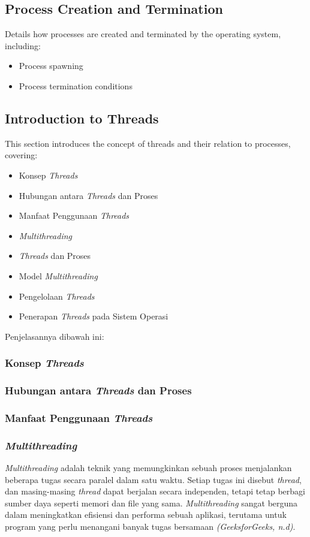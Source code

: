 \documentclass[12pt]{article}
\begin{document}
\subsection{Process Creation and Termination}
Details how processes are created and terminated by the operating system, including:
\begin{itemize}
    \item Process spawning
    \item Process termination conditions
\end{itemize}

\subsection{Introduction to Threads}
This section introduces the concept of threads and their relation to processes, covering:
\begin{itemize}
    \item Konsep \textit{Threads}
    \item Hubungan antara \textit{Threads} dan Proses
    \item Manfaat Penggunaan \textit{Threads}
    \item \textit{Multithreading}
    \item \textit{Threads} dan Proses
    \item Model \textit{Multithreading}
    \item Pengelolaan \textit{Threads}
    \item Penerapan \textit{Threads} pada Sistem Operasi
\end{itemize}
Penjelasannya dibawah ini:
\subsubsection{Konsep \textit{Threads}}
\subsubsection{Hubungan antara \textit{Threads} dan Proses}
\subsubsection{Manfaat Penggunaan \textit{Threads}}
\subsubsection{\textit{Multithreading}}
\textit{Multithreading} adalah teknik yang memungkinkan sebuah proses menjalankan beberapa tugas secara paralel dalam satu waktu. Setiap tugas ini disebut \textit{thread}, dan masing-masing \textit{thread} dapat berjalan secara independen, tetapi tetap berbagi sumber daya seperti memori dan file yang sama. \textit{Multithreading} sangat berguna dalam meningkatkan efisiensi dan performa sebuah aplikasi, terutama untuk program yang perlu menangani banyak tugas bersamaan \textit{(GeeksforGeeks, n.d)}.
\end{document}
